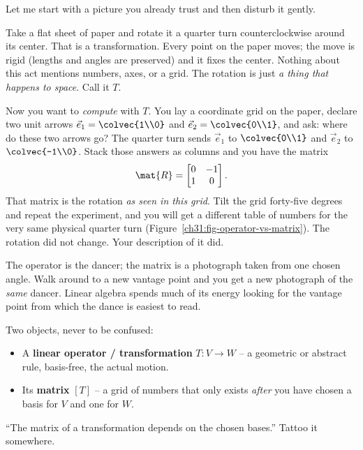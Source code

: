 Let me start with a picture you already trust and then disturb it gently.

Take a flat sheet of paper and rotate it a quarter turn counterclockwise around
its center. That is a transformation. Every point on the paper moves; the move is
rigid (lengths and angles are preserved) and it fixes the center. Nothing about
this act mentions numbers, axes, or a grid. The rotation is just \emph{a thing
that happens to space}. Call it $T$.

Now you want to \emph{compute} with $T$. You lay a coordinate grid on the paper,
declare two unit arrows $\vec{e}_1 = \colvec{1\\0}$ and $\vec{e}_2 = \colvec{0\\1}$,
and ask: where do these two arrows go? The quarter turn sends $\vec{e}_1$ to
$\colvec{0\\1}$ and $\vec{e}_2$ to $\colvec{-1\\0}$. Stack those answers as
columns and you have the matrix
\[
  \mat{R} = \begin{bmatrix} 0 & -1 \\ 1 & 0 \end{bmatrix}.
\]
That matrix is the rotation \emph{as seen in this grid}. Tilt the grid forty-five
degrees and repeat the experiment, and you will get a different table of numbers
for the very same physical quarter turn (Figure~\ref{ch31:fig-operator-vs-matrix}).
The rotation did not change. Your description of it did.

\begin{intuitionbox}
The operator is the dancer; the matrix is a photograph taken from one chosen
angle. Walk around to a new vantage point and you get a new photograph of the
\emph{same} dancer. Linear algebra spends much of its energy looking for the
vantage point from which the dance is easiest to read.
\end{intuitionbox}

\begin{focusbox}
Two objects, never to be confused:
\begin{itemize}
  \item A \textbf{linear operator / transformation} $T:V\to W$ -- a geometric or
        abstract rule, basis-free, the actual motion.
  \item Its \textbf{matrix} $[T]$ -- a grid of numbers that only exists \emph{after}
        you have chosen a basis for $V$ and one for $W$.
\end{itemize}
``The matrix of a transformation depends on the chosen bases.'' Tattoo it
somewhere.
\end{focusbox}

